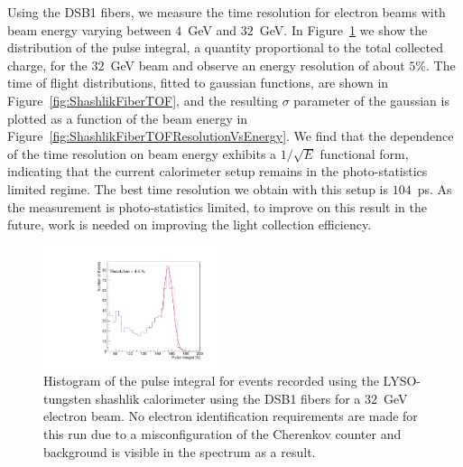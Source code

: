 \documentclass[12pt]{article}
\begin{document}
Using the DSB1 fibers, we measure the time resolution
for electron beams with beam energy varying between $4$~GeV and $32$~GeV.
In Figure~\ref{fig:ShashlikFiberEnergy32GeV} we show the distribution
of the pulse integral, a quantity proportional to the total collected charge,
for the $32$~GeV beam and observe an energy resolution of about $5\%$.
The time of flight distributions, fitted to gaussian functions,
are shown in Figure~\ref{fig:ShashlikFiberTOF}, and the resulting
$\sigma$ parameter of the gaussian is plotted as a function of the
beam energy in Figure~\ref{fig:ShashlikFiberTOFResolutionVsEnergy}.
We find that the dependence of the time resolution on
beam energy exhibits a $1/\sqrt{E}$ functional form, indicating
that the current calorimeter setup remains in the photo-statistics
limited regime. The best time resolution we obtain
with this setup is $104$~ps. As the measurement is photo-statistics
limited, to improve on this result in the future, work is needed
on improving the light collection efficiency. 

\begin{figure}[H] \centering
\includegraphics[width=0.45\textwidth]{figs/TOF_ShashlikDSB1Fiber_Electron_32GeV_energy} 
\caption{ Histogram of the pulse integral for events recorded using
the LYSO-tungsten shashlik calorimeter using the DSB1 fibers for 
a $32$~GeV electron beam. No electron identification requirements
are made for this run due to a misconfiguration of the Cherenkov counter
and background is visible in the spectrum as a result. } 
\label{fig:ShashlikFiberEnergy32GeV}
\end{figure}
\end{document}
